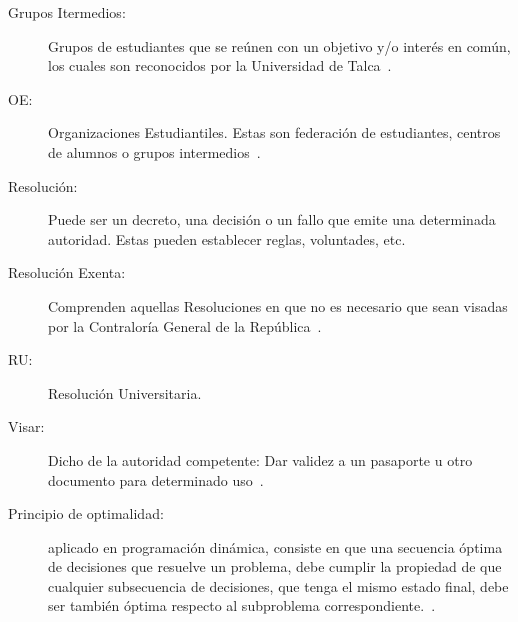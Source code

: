 \begin{glosario}
	\item 	\begin{description}
			\item[Grupos Itermedios:] Grupos de estudiantes que se reúnen con un objetivo y/o interés en común, los cuales son reconocidos por la Universidad de Talca~\cite{18}.
		\end{description}

	\item 	\begin{description}
			\item[OE:] Organizaciones Estudiantiles. Estas son federación de estudiantes, centros de alumnos o grupos intermedios~\cite{2}.
		\end{description}

	\item 	\begin{description}
			\item[Resolución:] Puede ser un decreto, una decisión o un fallo que emite una determinada autoridad. Estas pueden establecer reglas, voluntades, etc.
		\end{description}
	
	\item 	\begin{description}
			\item[Resolución Exenta:] Comprenden aquellas Resoluciones en que no es necesario que sean visadas por la Contraloría General de la República~\cite{3}.
		\end{description}
	
	\item 	\begin{description}
			\item[RU:] Resolución Universitaria.
		\end{description}

	\item 	\begin{description}
			    \item[Visar:] Dicho de la autoridad competente: Dar validez a un pasaporte u otro documento para determinado uso~\cite{4}.
			\end{description}

	\item 	\begin{description}
			    \item[Principio de optimalidad:] aplicado en programación dinámica, consiste en que una secuencia óptima de decisiones que resuelve un problema, debe cumplir la propiedad de que cualquier subsecuencia de decisiones, que tenga el mismo estado final, debe ser también óptima respecto al subproblema correspondiente.~\cite{21}.
			\end{description}  

\end{glosario}
